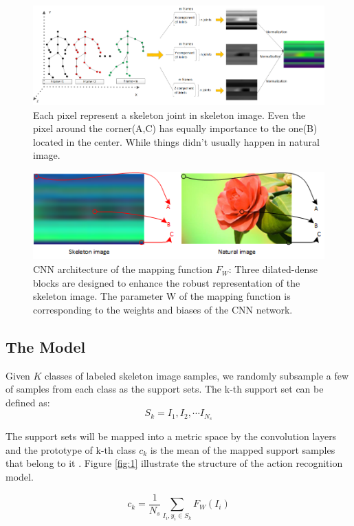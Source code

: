 \documentclass{bmvc2k}
\newcommand{\reffig}[1]{Figure \ref{#1}}
\begin{document}
\begin{figure}[htb]
	
\includegraphics[scale=0.95]{images/Figure_2.png}
\caption{Each pixel represent a skeleton joint in skeleton image. Even the pixel around the corner(A,C) has equally importance to the one(B) located in the center. While things didn’t usually happen in natural image.}

\label{fig:2}
\end{figure}

\begin{figure}	[htb]
\includegraphics[scale=0.24]{images/Figure_3.png}
\caption{CNN architecture of the mapping function $F_W$: Three dilated-dense blocks are designed to enhance the robust representation of the skeleton image. The parameter W of the mapping function is corresponding to the weights and biases of the CNN network.}
\label{fig:3}
\end{figure}

\subsection*{The Model}
Given $K$ classes of labeled skeleton image samples, we randomly subsample a few of samples from each class as the support sets. The k-th support set can be defined as:
$$S_k=I_1,I_2,\cdots I_{N_s}$$

The support sets will be mapped into a metric space by the convolution layers and the prototype of k-th class $c_k$ is the mean of the mapped support samples that belong to it . \reffig{fig:1} illustrate the structure of the action recognition model.

$$c_k=\frac{1}{N_s} \sum \limits_{I_i,y_i\in S_k}F_W (I_i)$$
\end{document}
